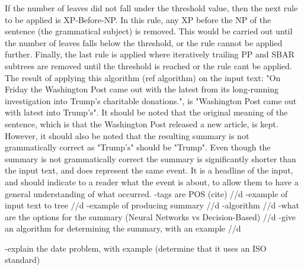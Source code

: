 \par If the number of leaves did not fall under the threshold value, then the next rule to be applied is XP-Before-NP. In this rule, any XP before the NP of the sentence (the grammatical subject) is removed. This would be carried out until the number of leaves falls below the threshold, or the rule cannot be applied further. Finally, the last rule is applied where iteratively trailing PP and SBAR subtrees are removed until the threshold is reached or the rule cant be applied. The result of applying this algorithm (ref algorithm) on the input text: "On Friday the Washington Post came out with the latest from its long-running investigation into Trump's charitable donations.", is "Washington Post came out with latest into Trump's". It should be noted that the original meaning of the sentence, which is that the Washington Post released a new article, is kept. However, it should also be noted that the resulting summary is not grammatically correct as "Trump's" should be "Trump". Even though the summary is not grammatically correct the summary is significantly shorter than the input text, and does represent the same event. It is a headline of the input, and should indicate to a reader what the event is about, to allow them to have a general understanding of what occurred.
-tags are POS (cite) //d
-example of input text to tree //d
-example of producing summary //d 
-algorithm //d 
-what are the options for the summary (Neural Networks vs Decision-Based) //d
-give an algorithm for determining the summary, with an example //d

-explain the date problem, with example (determine that it uses an ISO standard)
